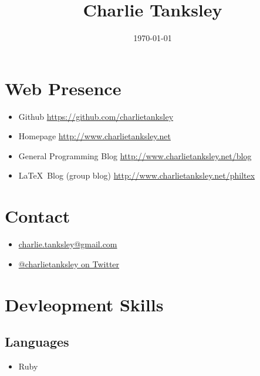 \documentclass{article}
\title{Charlie Tanksley}
\date{\today}
\begin{document}
\maketitle

\section{Web Presence} %
\label{sec:Web Presence}

\begin{itemize}
  \item Github 
    \href{https://github.com/charlietanksley}{https://github.com/charlietanksley}
  \item Homepage 
    \href{http://www.charlietanksley.net}{http://www.charlietanksley.net}
  \item General Programming Blog
    \href{http://www.charlietanksley.net/blog}{http://www.charlietanksley.net/blog}
  \item \LaTeX\ Blog (group blog)
    \href{http://www.charlietanksley.net/philtex}{http://www.charlietanksley.net/philtex}
\end{itemize}

\section{Contact} %
\label{sec:Contact}

\begin{itemize}
  \item 
    \href{mailto:charlie.tanksley@gmail.com}{charlie.tanksley@gmail.com}
  \item \href{http://www.twitter.com/charlietanksley}{@charlietanksley 
    on Twitter}
\end{itemize}

\section{Devleopment Skills} %
\label{sec:Devleopment Skills}

\subsection{Languages} %
\label{sub:Languages}

\begin{itemize}
  \item Ruby
\end{itemize}
\end{document}
